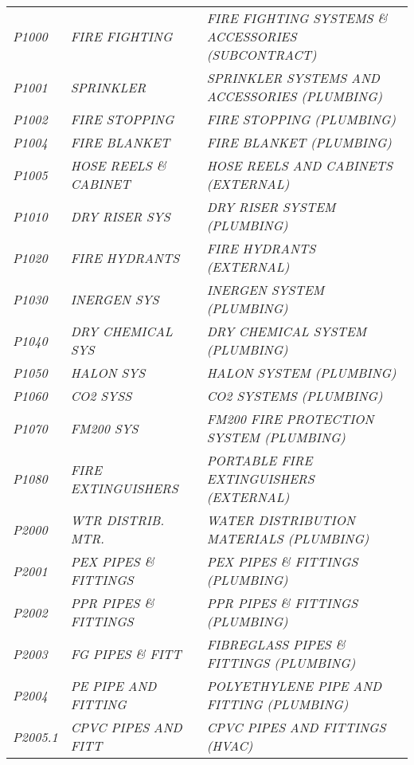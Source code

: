 \begin{landscape}
\begin{longtable}[l]{l%
                  l|%
                  l|}
\itshape P1000       &\itshape FIRE FIGHTING   &\itshape FIRE FIGHTING SYSTEMS \& ACCESSORIES (SUBCONTRACT)   \\
\itshape P1001       &\itshape SPRINKLER   &\itshape SPRINKLER SYSTEMS AND ACCESSORIES (PLUMBING)   \\
\itshape P1002       &\itshape FIRE STOPPING   &\itshape FIRE STOPPING (PLUMBING)   \\
\itshape P1004       &\itshape FIRE BLANKET   &\itshape FIRE BLANKET (PLUMBING)   \\
\itshape P1005       &\itshape HOSE REELS \& CABINET   &\itshape HOSE REELS AND CABINETS (EXTERNAL)   \\
\itshape P1010       &\itshape DRY RISER SYS   &\itshape DRY RISER SYSTEM (PLUMBING)   \\
\itshape P1020       &\itshape FIRE HYDRANTS   &\itshape FIRE HYDRANTS (EXTERNAL)   \\
\itshape P1030       &\itshape INERGEN SYS   &\itshape INERGEN SYSTEM (PLUMBING)   \\
\itshape P1040       &\itshape DRY CHEMICAL SYS   &\itshape DRY CHEMICAL SYSTEM (PLUMBING)   \\
\itshape P1050       &\itshape HALON SYS   &\itshape HALON SYSTEM (PLUMBING)   \\
\itshape P1060       &\itshape CO2 SYSS   &\itshape CO2 SYSTEMS (PLUMBING)   \\
\itshape P1070       &\itshape FM200  SYS   &\itshape FM200 FIRE PROTECTION SYSTEM (PLUMBING)   \\
\itshape P1080       &\itshape FIRE EXTINGUISHERS   &\itshape PORTABLE FIRE EXTINGUISHERS (EXTERNAL)   \\
\itshape P2000       &\itshape WTR DISTRIB. MTR.   &\itshape WATER DISTRIBUTION MATERIALS (PLUMBING)   \\
\itshape P2001       &\itshape PEX PIPES \& FITTINGS   &\itshape PEX PIPES \& FITTINGS (PLUMBING)   \\
\itshape P2002       &\itshape PPR PIPES \& FITTINGS   &\itshape PPR PIPES \& FITTINGS (PLUMBING)   \\
\itshape P2003       &\itshape FG PIPES \& FITT   &\itshape FIBREGLASS PIPES \& FITTINGS (PLUMBING)   \\
\itshape P2004       &\itshape PE PIPE AND FITTING   &\itshape POLYETHYLENE PIPE AND FITTING (PLUMBING)   \\
\itshape P2005.1     &\itshape CPVC PIPES AND FITT   &\itshape CPVC PIPES AND FITTINGS (HVAC)   \\

\end{longtable}
\end{landscape}
